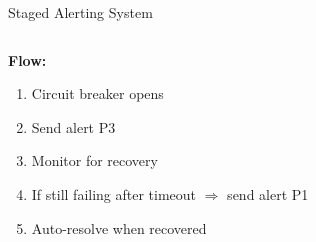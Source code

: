 \documentclass[aspectratio=169]{beamer}
\begin{document}
\begin{frame}{Staged Alerting System}
\begin{columns}
     \hspace{-0.5cm}
        \begin{column}{0.55\textwidth}
            \textbf{Flow:}
            \begin{enumerate}
                \item Circuit breaker opens
                \item Send alert P3
                \item Monitor for recovery
                \item If still failing after timeout $\Rightarrow$ send alert P1
                \item Auto-resolve when recovered
            \end{enumerate}
        \end{column}
    \end{columns}
\end{frame}
\end{document}
